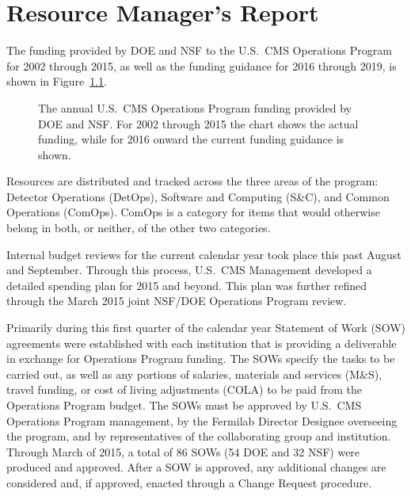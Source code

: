 
\chapter{Resource Manager's Report}

The funding provided by DOE and NSF to the U.S.\ CMS Operations Program
for 2002 through 2015, as well as the funding guidance for 2016 through 2019,
is shown in Figure\ \ref{fig:funding_profile}.

\begin{figure}[hbtp]
  \begin{center}
    \caption{The annual U.S.\ CMS Operations Program funding provided by
DOE and NSF.  For 2002 through 2015 the chart shows the actual funding,
while for 2016 onward the current funding guidance is shown.}
    \label{fig:funding_profile}
  \end{center}
\end{figure}

Resources are distributed and tracked across the three areas of the program:  Detector Operations (DetOps),
Software and Computing (S\&C), and Common Operations (ComOps).
ComOps is a category for items that would otherwise belong in both, or
neither, of the other two categories.

Internal budget reviews for the current calendar year took place this
past August and September.  Through this process, U.S.\ CMS Management
developed a detailed spending plan for 2015 and beyond. 
This plan was further refined
through the March 2015 joint NSF/DOE Operations Program review.

Primarily during this first quarter of the calendar year Statement of Work (SOW) agreements were established with each institution that is providing a deliverable in exchange for Operations Program funding. The SOWs specify the tasks to be carried out, as well as any portions of salaries, materials and services (M\&S), travel funding, or cost of living adjustments (COLA) to be paid from the Operations Program budget. The SOWs must be approved by U.S.\ CMS Operations Program management, by the Fermilab Director Designee overseeing the program, and by representatives of the collaborating group and institution. Through March of 2015, a total of 86 SOWs (54 DOE and 32 NSF) were produced and approved.  After a SOW is approved, any additional changes are considered and, if approved, enacted through a Change Request procedure.

